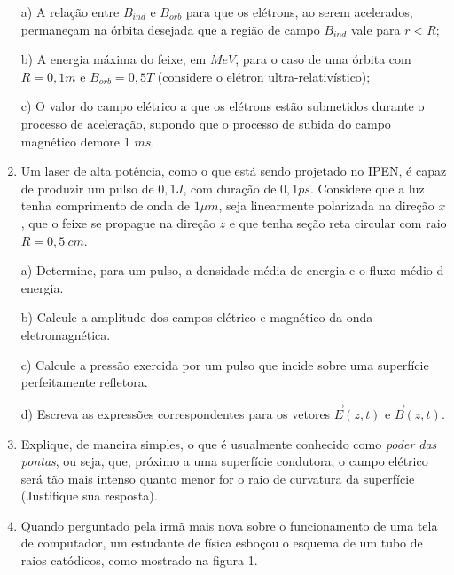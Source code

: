 \begin{enumerate}[start=1,label={\bfseries Q\arabic*.}]
a) A relação entre $B_{ind}$ e $B_{orb}$ para que os elétrons, ao serem acelerados, permaneçam na órbita desejada que a região de campo $B_{ind}$ vale para $r<R$;

\resposta

b) A energia máxima do feixe, em $MeV$, para o caso de uma órbita com $R = 0,1 m$ e $B_{orb} = 0,5 T$ (considere o elétron ultra-relativístico);

\resposta

c) O valor do campo elétrico a que os elétrons estão submetidos durante o processo de aceleração, supondo que o processo de subida do campo magnético demore 1 $ms$.

\resposta


\item Um laser de alta potência, como o que está sendo projetado no IPEN, é capaz de produzir um pulso de $0,1 J$, com duração de $0,1 ps$. Considere que a luz tenha comprimento de onda de $1 \mu m$, seja linearmente polarizada na direção $x$, que o feixe se propague na direção $z$ e que tenha seção reta circular com raio $R = 0,5 \ cm$.

a) Determine, para um pulso, a densidade média de energia e o fluxo médio d energia.

\resposta

b) Calcule a amplitude dos campos elétrico e magnético da onda eletromagnética.

\resposta

c) Calcule a pressão exercida por um pulso que incide sobre uma superfície perfeitamente refletora.

\resposta

d) Escreva as expressões correspondentes para os vetores $\vec{E}(z,t)$ e $\vec{B}(z,t)$.

\resposta



\item Explique, de maneira simples, o que é usualmente conhecido como \textit{poder das pontas}, ou seja, que, próximo a uma superfície condutora, o campo elétrico será tão mais intenso quanto menor for o raio de curvatura da superfície (Justifique sua resposta).


\item Quando perguntado pela irmã mais nova sobre o funcionamento de uma tela de computador, um estudante de física esboçou o esquema de um tubo de raios catódicos, como mostrado na figura 1.


\end{enumerate}
